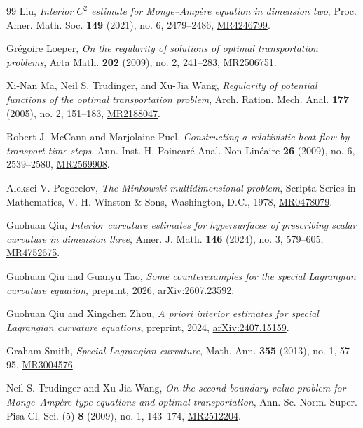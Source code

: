 \documentclass[12pt,letterpaper]{amsart}
\theoremstyle{definition}
\theoremstyle{plain}
\numberwithin{equation}{section}
\begin{document}
\begin{thebibliography}{99}
Liu, \emph{Interior $C^2$ estimate for Monge--Amp\`ere equation in
dimension two}, Proc. Amer. Math. Soc. \textbf{149} (2021), no. 6,
2479--2486,
\href{https://mathscinet.ams.org/mathscinet/article?mr=4246799}{MR4246799}.

Gr\'egoire Loeper, \emph{On the regularity of solutions of optimal
transportation problems}, Acta Math. \textbf{202} (2009), no. 2, 241--283,
\href{https://mathscinet.ams.org/mathscinet-getitem?mr=2506751}{MR2506751}.

Xi-Nan Ma, Neil S. Trudinger, and Xu-Jia Wang, \emph{Regularity of
potential functions of the optimal transportation problem}, Arch. Ration.
Mech. Anal. \textbf{177} (2005), no. 2, 151--183,
\href{https://mathscinet.ams.org/mathscinet-getitem?mr=2188047}{MR2188047}.

Robert J. McCann and Marjolaine Puel, \emph{Constructing a relativistic
heat flow by transport time steps}, Ann. Inst. H. Poincar\'e Anal. Non
Lin\'eaire \textbf{26} (2009), no. 6, 2539--2580,
\href{https://mathscinet.ams.org/mathscinet-getitem?mr=2569908}{MR2569908}.

Aleksei V. Pogorelov, \emph{The Minkowski multidimensional problem},
Scripta Series in Mathematics, V. H. Winston \& Sons, Washington, D.C., 1978,
\href{https://mathscinet.ams.org/mathscinet-getitem?mr=478079}{MR0478079}.

Guohuan Qiu, \emph{Interior curvature estimates for hypersurfaces of
prescribing scalar curvature in dimension three}, Amer. J. Math.
\textbf{146} (2024), no. 3, 579--605,
\href{https://mathscinet.ams.org/mathscinet/article?mr=4752675}{MR4752675}.

Guohuan Qiu and Guanyu Tao, \emph{Some counterexamples for the special
Lagrangian curvature equation}, preprint, 2026,
\href{https://arxiv.org/abs/2607.23592}{arXiv:2607.23592}.

Guohuan Qiu and Xingchen Zhou, \emph{A priori interior estimates for
special Lagrangian curvature equations}, preprint, 2024,
\href{https://arxiv.org/abs/2407.15159}{arXiv:2407.15159}.

Graham Smith, \emph{Special Lagrangian curvature}, Math. Ann.
\textbf{355} (2013), no. 1, 57--95,
\href{https://mathscinet.ams.org/mathscinet-getitem?mr=3004576}{MR3004576}.

Neil S. Trudinger and Xu-Jia Wang, \emph{On the second boundary value
problem for Monge--Amp\`ere type equations and optimal transportation},
Ann. Sc. Norm. Super. Pisa Cl. Sci. (5) \textbf{8} (2009), no. 1, 143--174,
\href{https://mathscinet.ams.org/mathscinet-getitem?mr=2512204}{MR2512204}.


\end{thebibliography}
\end{document}
